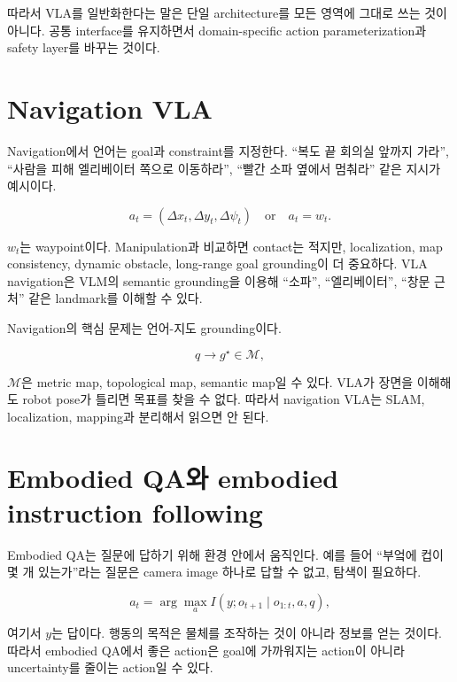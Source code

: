 따라서 VLA를 일반화한다는 말은 단일 architecture를 모든 영역에 그대로 쓰는 것이 아니다. 공통 interface를 유지하면서 domain-specific action parameterization과 safety layer를 바꾸는 것이다.

\section{Navigation VLA}

Navigation에서 언어는 goal과 constraint를 지정한다. ``복도 끝 회의실 앞까지 가라'', ``사람을 피해 엘리베이터 쪽으로 이동하라'', ``빨간 소파 옆에서 멈춰라'' 같은 지시가 예시이다.

\begin{equation}
  a_t =
  (\Delta x_t, \Delta y_t, \Delta \psi_t)
  \quad \text{or} \quad
  a_t = w_t.
\end{equation}

$w_t$는 waypoint이다. Manipulation과 비교하면 contact는 적지만, localization, map consistency, dynamic obstacle, long-range goal grounding이 더 중요하다. VLA navigation은 VLM의 semantic grounding을 이용해 ``소파'', ``엘리베이터'', ``창문 근처'' 같은 landmark를 이해할 수 있다.

Navigation의 핵심 문제는 언어-지도 grounding이다.

\begin{equation}
  q
  \rightarrow
  g^\star
  \in
  \mathcal{M},
\end{equation}

$\mathcal{M}$은 metric map, topological map, semantic map일 수 있다. VLA가 장면을 이해해도 robot pose가 틀리면 목표를 찾을 수 없다. 따라서 navigation VLA는 SLAM, localization, mapping과 분리해서 읽으면 안 된다.

\section{Embodied QA와 embodied instruction following}

Embodied QA는 질문에 답하기 위해 환경 안에서 움직인다. 예를 들어 ``부엌에 컵이 몇 개 있는가''라는 질문은 camera image 하나로 답할 수 없고, 탐색이 필요하다.

\begin{equation}
  a_t
  =
  \arg\max_a
  I(y; o_{t+1} \mid o_{1:t},a,q),
\end{equation}

여기서 $y$는 답이다. 행동의 목적은 물체를 조작하는 것이 아니라 정보를 얻는 것이다. 따라서 embodied QA에서 좋은 action은 goal에 가까워지는 action이 아니라 uncertainty를 줄이는 action일 수 있다.


